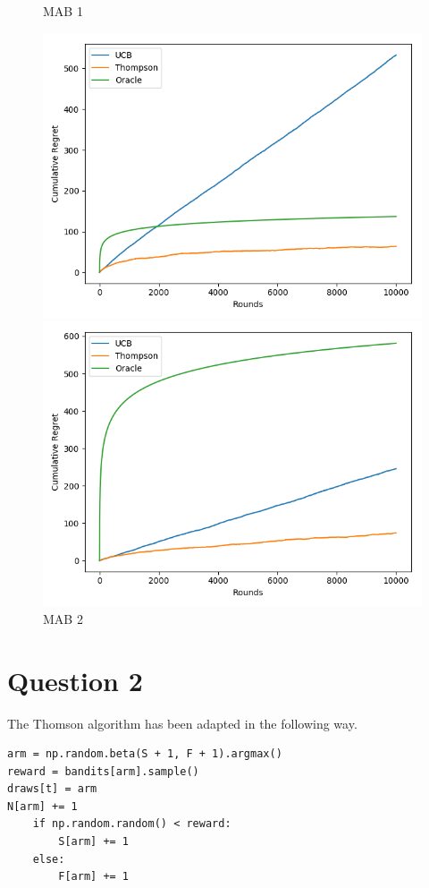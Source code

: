 \documentclass[10pt,a4paper]{article}
\begin{document}
\begin{figure}[h]
\centering
\begin{minipage}{0,45\textwidth}
\caption{MAB 1}
\includegraphics[scale=.45]{mab_1.png}
\end{minipage}
\begin{minipage}{0,45\textwidth}
\caption{MAB 2}
\includegraphics[scale=.45]{mab_2.png}
\end{minipage}
\end{figure}
\newpage
\section{Question 2}

The Thomson algorithm has been adapted in the following way.
\begin{lstlisting}
arm = np.random.beta(S + 1, F + 1).argmax()
reward = bandits[arm].sample()
draws[t] = arm
N[arm] += 1
    if np.random.random() < reward:
        S[arm] += 1
    else:
        F[arm] += 1
\end{lstlisting}
\end{document}
